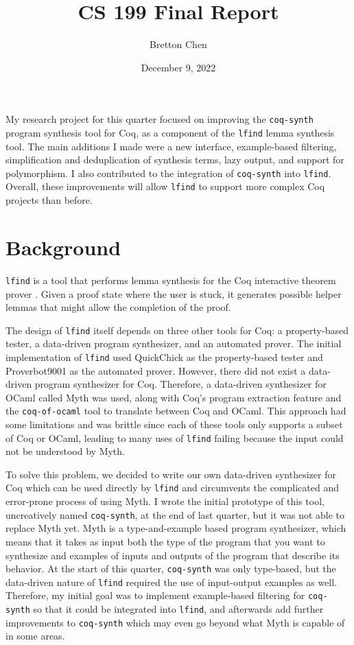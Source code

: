 \documentclass[11pt]{article}
\title{CS 199 Final Report}
\author{Bretton Chen}
\date{December 9, 2022}
\begin{document}
\maketitle

My research project for this quarter focused on improving the \texttt{coq-synth} program synthesis tool for Coq, as a component of the \texttt{lfind} lemma synthesis tool. The main additions I made were a new interface, example-based filtering, simplification and deduplication of synthesis terms, lazy output, and support for polymorphism. I also contributed to the integration of \texttt{coq-synth} into \texttt{lfind}. Overall, these improvements will allow \texttt{lfind} to support more complex Coq projects than before.

\section{Background}

\texttt{lfind} is a tool that performs lemma synthesis for the Coq interactive theorem prover \cite{lfind}. Given a proof state where the user is stuck, it generates possible helper lemmas that might allow the completion of the proof.

The design of \texttt{lfind} itself depends on three other tools for Coq: a property-based tester, a data-driven program synthesizer, and an automated prover. The initial implementation of \texttt{lfind} used QuickChick as the property-based tester and Proverbot9001 as the automated prover. However, there did not exist a data-driven program synthesizer for Coq. Therefore, a data-driven synthesizer for OCaml called Myth was used, along with Coq's program extraction feature and the \texttt{coq-of-ocaml} tool to translate between Coq and OCaml. This approach had some limitations and was brittle since each of these tools only supports a subset of Coq or OCaml, leading to many uses of \texttt{lfind} failing because the input could not be understood by Myth.

To solve this problem, we decided to write our own data-driven synthesizer for Coq which can be used directly by \texttt{lfind} and circumvents the complicated and error-prone process of using Myth. I wrote the initial prototype of this tool, uncreatively named \texttt{coq-synth}, at the end of last quarter, but it was not able to replace Myth yet. Myth is a type-and-example based program synthesizer, which means that it takes as input both the type of the program that you want to synthesize and examples of inputs and outputs of the program that describe its behavior. At the start of this quarter, \texttt{coq-synth} was only type-based, but the data-driven nature of \texttt{lfind} required the use of input-output examples as well. Therefore, my initial goal was to implement example-based filtering for \texttt{coq-synth} so that it could be integrated into \texttt{lfind}, and afterwards add further improvements to \texttt{coq-synth} which may even go beyond what Myth is capable of in some areas.
\end{document}
